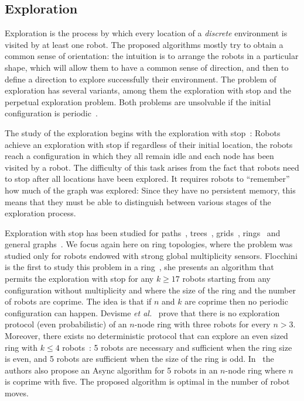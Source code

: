 \subsection{Exploration}
Exploration is the process by which every location of a \emph{discrete} environment is visited by at least one robot. 
The proposed algorithms mostly try to obtain a common sense of orientation:  the intuition is to arrange the robots in a particular shape, which will allow them to have a common sense of direction, and then to define a direction to explore successfully their environment.
The problem of exploration has several variants, among them the exploration with stop and the perpetual exploration problem.
Both problems are unsolvable if the initial configuration is periodic~\cite{flocchini_computing_2007}.

The study of the exploration begins with the exploration with stop~\cite{flocchini_computing_2007}: 
Robots achieve an exploration with stop if regardless of their initial location, the robots reach a configuration in which they all remain idle and 
each node has been visited by a robot. The difficulty of this task arises from the fact that robots need to stop after all locations have been explored. It requires robots to “remember” how much of the graph was explored: Since they have no persistent memory, this means that they must be able to distinguish between various stages of the exploration process. 
 
Exploration with stop has been studied for paths~\cite{FlocchiniIPS11}, trees~\cite{FlocchiniIPS10}, grids~\cite{devismes_optimal_2011}, rings~\cite{flocchini_computing_2007} and general graphs~\cite{ChalopinFMS10}.
We focus again here on ring topologies, where the problem was studied only for robots endowed with strong global multiplicity sensors.
Flocchini is the first to study this problem in a ring~\cite{flocchini_computing_2007}, she presents an algorithm that permits the exploration with stop for any $k \geq 17$ robots starting from any configuration without multiplicity and where the size of the ring and the number of robots are coprime. The idea is that if $n$ and $k$ are coprime then no periodic configuration can happen.
 Devisme \textit{et al.}~\cite{devismes_optimal_2010-1} prove that there is no exploration protocol (even probabilistic) of an $n$-node ring with three robots for every $n > 3$. 
 Moreover, there exists no deterministic protocol that can explore an even sized ring with $k \leq 4$ robots~\cite{lamani_optimal_2010}: 5 robots are necessary and sufficient when the ring size is even, and 5 robots are sufficient when the size of the ring is odd.
 In~\cite{lamani_optimal_2010} the authors also propose an Async algorithm for 5 robots in an $n$-node ring where $n$ is coprime with five. The proposed algorithm is optimal in the number of robot moves.  
 
